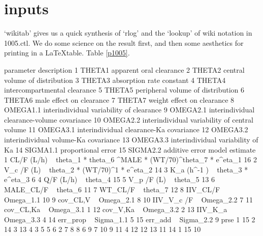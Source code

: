 \section{inputs}
`wikitab' gives us a quick synthesis of `rlog' and the `lookup' of wiki notation in 1005.ctl.
We do some science on the result first, and then some aesthetics for printing in a \LaTeX table.  Table \ref{p1005}.
\begin{Schunk}
\begin{Soutput}
   parameter                                   description
1     THETA1                       apparent oral clearance
2     THETA2                central volume of distribution
3     THETA3                      absorption rate constant
4     THETA4                  intercompartmental clearance
5     THETA5             peripheral volume of distribution
6     THETA6                      male effect on clearance
7     THETA7                    weight effect on clearance
8   OMEGA1.1      interindividual variability of clearance
9   OMEGA2.1   interindividual clearance-volume covariance
10  OMEGA2.2 interindividual variability of central volume
11  OMEGA3.1       interindividual clearance-Ka covariance
12  OMEGA3.2          interindividual volume-Ka covariance
13  OMEGA3.3             interindividual variability of Ka
14  SIGMA1.1                            proportional error
15  SIGMA2.2                                additive error
                                                                model estimate
1  CL/F (L/h) ~ theta_1 *  theta_6 ^MALE * (WT/70)^theta_7  * e^eta_1       16
2                          V_c /F (L) ~ theta_2 * (WT/70)^1 * e^eta_2       14
3                                     K_a (h^-1 ) ~ theta_3 * e^eta_3        6
4                                                 Q/F (L/h) ~ theta_4       15
5                                                V_p /F (L) ~ theta_5       13
6                                                 MALE_CL/F ~ theta_6       11
7                                                   WT_CL/F ~ theta_7       12
8                                                IIV_CL/F ~ Omega_1.1       10
9                                                cov_CL,V ~ Omega_2.1        8
10                                             IIV_V_c /F ~ Omega_2.2        7
11                                             cov_CL,Ka  ~ Omega_3.1        1
12                                              cov_V,Ka  ~ Omega_3.2        2
13                                               IIV_K_a  ~ Omega_3.3        4
14                                               err_prop ~ Sigma_1.1        5
15                                                err_add ~ Sigma_2.2        9
   prse
1    15
2    14
3    13
4     3
5     5
6     2
7     8
8     6
9     7
10    9
11    4
12   12
13   11
14    1
15   10
\end{Soutput}
\end{Schunk}

